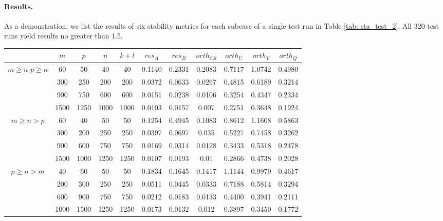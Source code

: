         \paragraph{Results.}
        As a demonstration, we list the results of six stability metrics for each subcase of a single test run in Table \ref{tab: sta_test_2}. All 320 test runs yield results no greater than 1.5. 
        
    \newpage 
    
    \begin{table}[!htbp]
        \centering
        \begin{tabular}{||c | c | c | c | c || c | c | c | c | c | c||} 
         \hline
         & $m$ & $p$ & $n$ & $k+l$ & $res_A$ & $res_B$ & $orth_{CS}$ & $orth_U$ & $orth_V$ & $orth_Q$ \\ [0.5ex] 
         \hline\hline
          & 60 & 50 & 40 & 40 & 0.1140 & 0.2331 & 0.2083 & 0.7117 & 1.0742 & 0.4980 \\
         & 300 & 250 & 200 & 200 & 0.0372 & 0.0633 & 0.0267 & 0.4815 & 0.6189 & 0.3214 \\
         & 900 & 750 & 600 & 600 & 0.0151 & 0.0238 & 0.0106 & 0.3254 & 0.4347 & 0.2334 \\
         & 1500 & 1250 & 1000 & 1000 & 0.0103 & 0.0157 & 0.007 & 0.2751 & 0.3648 & 0.1924 \\
        \hline\hline
          & 60 & 40 & 50 & 50 & 0.1254 & 0.4945 & 0.1083 & 0.8612 & 1.1608 & 0.5863 \\
         & 300 & 200 & 250 & 250 & 0.0397 & 0.0697 & 0.035 & 0.5227 & 0.7458 & 0.3262 \\
         & 900 & 600 & 750 & 750 & 0.0169 & 0.0314 & 0.0128 & 0.3433 & 0.5318 & 0.2478 \\
         & 1500 & 1000 & 1250 & 1250 & 0.0107 & 0.0193 & 0.01 & 0.2866 & 0.4738 & 0.2028 \\
         \hline\hline 
          & 40 & 60 & 50 & 50 & 0.1834 & 0.1645 & 0.1417 & 1.1144 & 0.9979 & 0.4617 \\
         & 200 & 300 & 250 & 250 & 0.0511 & 0.0445 & 0.0333 & 0.7188 & 0.5814 & 0.3294 \\
         & 600 & 900 & 750 & 750 & 0.0212 & 0.0183 & 0.0133 & 0.4400 & 0.3941 & 0.2111 \\
         & 1000 & 1500 & 1250 & 1250 & 0.0173 & 0.0132 & 0.012 & 0.3897 & 0.3450 & 0.1772 \\

\end{tabular}
\end{table}
